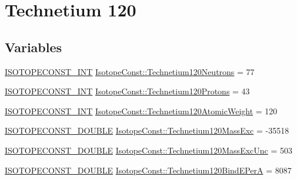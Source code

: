 \hypertarget{group___isotope_const-_technetium-_tc120}{}\section{Technetium 120}
\label{group___isotope_const-_technetium-_tc120}
\subsection*{Variables}
\begin{DoxyCompactItemize}
\item 
\mbox{\hyperlink{group___isotope_const-_macros_ga5f18360b3e99483a35c32d789e62621c}{I\+S\+O\+T\+O\+P\+E\+C\+O\+N\+S\+T\+\_\+\+I\+NT}} \mbox{\hyperlink{group___isotope_const-_technetium-_tc120_ga401dced2ef36db4aee362268192798e5}{Isotope\+Const\+::\+Technetium120\+Neutrons}} = 77
\item 
\mbox{\hyperlink{group___isotope_const-_macros_ga5f18360b3e99483a35c32d789e62621c}{I\+S\+O\+T\+O\+P\+E\+C\+O\+N\+S\+T\+\_\+\+I\+NT}} \mbox{\hyperlink{group___isotope_const-_technetium-_tc120_ga3148aa8c8d6fb85631424c7868eb982a}{Isotope\+Const\+::\+Technetium120\+Protons}} = 43
\item 
\mbox{\hyperlink{group___isotope_const-_macros_ga5f18360b3e99483a35c32d789e62621c}{I\+S\+O\+T\+O\+P\+E\+C\+O\+N\+S\+T\+\_\+\+I\+NT}} \mbox{\hyperlink{group___isotope_const-_technetium-_tc120_ga1ae5a6d9d6c0bbf7ccd915e143a5fdf1}{Isotope\+Const\+::\+Technetium120\+Atomic\+Weight}} = 120
\item 
\mbox{\hyperlink{group___isotope_const-_macros_ga8f45a7272ce02c0b4c65c44636ed719a}{I\+S\+O\+T\+O\+P\+E\+C\+O\+N\+S\+T\+\_\+\+D\+O\+U\+B\+LE}} \mbox{\hyperlink{group___isotope_const-_technetium-_tc120_gad97594bcfdadf3556eb5f9f37eb780aa}{Isotope\+Const\+::\+Technetium120\+Mass\+Exc}} = -\/35518
\item 
\mbox{\hyperlink{group___isotope_const-_macros_ga8f45a7272ce02c0b4c65c44636ed719a}{I\+S\+O\+T\+O\+P\+E\+C\+O\+N\+S\+T\+\_\+\+D\+O\+U\+B\+LE}} \mbox{\hyperlink{group___isotope_const-_technetium-_tc120_ga73d0cb0a931d33199b49cc8579d5ccd6}{Isotope\+Const\+::\+Technetium120\+Mass\+Exc\+Unc}} = 503
\item 
\mbox{\hyperlink{group___isotope_const-_macros_ga8f45a7272ce02c0b4c65c44636ed719a}{I\+S\+O\+T\+O\+P\+E\+C\+O\+N\+S\+T\+\_\+\+D\+O\+U\+B\+LE}} \mbox{\hyperlink{group___isotope_const-_technetium-_tc120_ga71acc4337bf8fbf9585c86a74a6483f0}{Isotope\+Const\+::\+Technetium120\+Bind\+E\+PerA}} = 8087
\item 

\end{DoxyCompactItemize}
